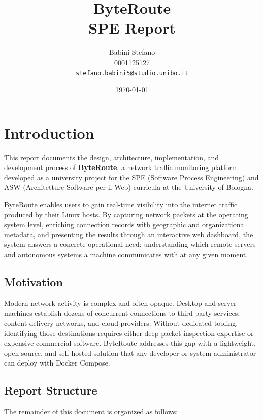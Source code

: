 \documentclass[12pt]{report}
\title{\textbf{ByteRoute} \\ \large SPE Report}
\author{
  Babini Stefano\\
  0001125127 \\
  \texttt{stefano.babini5@studio.unibo.it}
}
\date{\today}
\begin{document}
\maketitle
\newpage
\tableofcontents{}
\newpage

\chapter{Introduction}

This report documents the design, architecture, implementation, and development
process of \textbf{ByteRoute}, a network traffic monitoring platform developed
as a university project for the SPE (Software Process Engineering) and ASW
(Architetture Software per il Web) curricula at the University of Bologna.

ByteRoute enables users to gain real-time visibility into the internet traffic
produced by their Linux hosts. By capturing network packets at the operating
system level, enriching connection records with geographic and organizational
metadata, and presenting the results through an interactive web dashboard, the
system answers a concrete operational need: understanding which remote servers
and autonomous systems a machine communicates with at any given moment.

\section{Motivation}

Modern network activity is complex and often opaque. Desktop and server
machines establish dozens of concurrent connections to third-party services,
content delivery networks, and cloud providers. Without dedicated tooling,
identifying those destinations requires either deep packet inspection expertise
or expensive commercial software. ByteRoute addresses this gap with a
lightweight, open-source, and self-hosted solution that any developer or system
administrator can deploy with Docker Compose.

\newpage
\section{Report Structure}

The remainder of this document is organized as follows:
\end{document}
